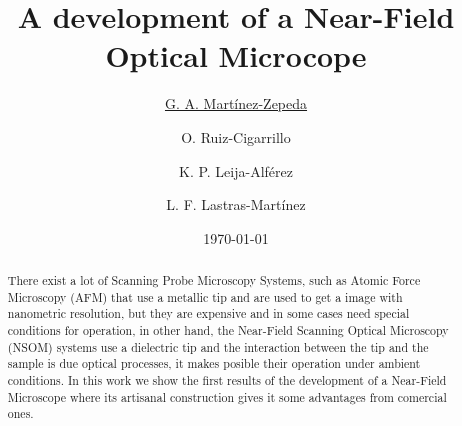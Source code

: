 \documentclass[reprint,aps,prb,citeautoscript,altaffilletter]{revtex4-2}
\begin{document}
	
	
	\title{ A development of a Near-Field Optical Microcope }
	\author{\underline{G. A. Mart\'inez-Zepeda}}
	\author{O. Ruiz-Cigarrillo}
	\author{{K. P. Leija-Alf\'erez}}
	\author{L. F. Lastras-Mart\'inez}
	
	\date{\today}
	
	\begin{abstract}
		There exist a lot of Scanning Probe Microscopy Systems, such as Atomic Force Microscopy (AFM) that use a metallic tip and are used to get a image with nanometric resolution, but they are expensive  and in some cases need special conditions for operation, in other hand, the Near-Field Scanning Optical Microscopy (NSOM) systems use a dielectric tip
		and the interaction between the tip and the sample is due optical processes, it makes posible their operation under ambient conditions. In this work we show the first results of the development  of a Near-Field Microscope where its artisanal construction gives it some advantages from comercial ones.
		
	\end{abstract}
	
	\maketitle
	

	
%	
%	
	
\end{document}
